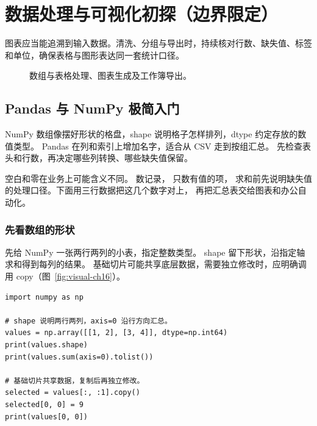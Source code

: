 \chapter[数据处理与可视化初探]{数据处理与可视化初探（边界限定）}
\label{ch:16-outline}

图表应当能追溯到输入数据。清洗、分组与导出时，持续核对行数、缺失值、标签和单位，确保表格与图形表达同一套统计口径。


\begin{figure}[htbp]
  \centering
  \caption*{数组与表格处理、图表生成及工作簿导出。}
\end{figure}


\section{Pandas 与 NumPy 极简入门}

NumPy 数组像摆好形状的格盘，shape 说明格子怎样排列，dtype 约定存放的数值类型。
Pandas 在列和索引上增加名字，适合从 CSV 走到按组汇总。
先检查表头和行数，再决定哪些列转换、哪些缺失值保留。

空白和零在业务上可能含义不同。 数记录， 只数有值的项，
求和前先说明缺失值的处理口径。下面用三行数据把这几个数字对上，
再把汇总表交给图表和办公自动化。

\subsection*{先看数组的形状}

先给 NumPy 一张两行两列的小表，指定整数类型。
shape 留下形状，沿指定轴求和得到每列的结果。
基础切片可能共享底层数据，需要独立修改时，应明确调用 copy（图~\ref{fig:visual-ch16}）。


\begin{lstlisting}[title={\code{array_shape.py}}]
import numpy as np

# shape 说明两行两列，axis=0 沿行方向汇总。
values = np.array([[1, 2], [3, 4]], dtype=np.int64)
print(values.shape)
print(values.sum(axis=0).tolist())

# 基础切片共享数据，复制后再独立修改。
selected = values[:, :1].copy()
selected[0, 0] = 9
print(values[0, 0])
\end{lstlisting}


